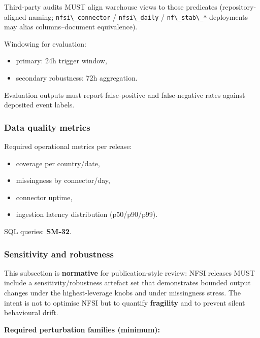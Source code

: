 \documentclass[
  11pt,
  peerreview,journal,onecolumn]{IEEEtran}
\newcommand{\passthrough}[1]{#1}
\providecommand{\tightlist}{%
  \setlength{\itemsep}{0pt}\setlength{\parskip}{0pt}}
\begin{document}
Third-party audits MUST align warehouse views to those predicates
(repository-aligned naming; \passthrough{\lstinline!nfsi\_connector!} /
\passthrough{\lstinline!nfsi\_daily!} /
\passthrough{\lstinline!nf\_stab\_*!} deployments may alias
columns--document equivalence).

Windowing for evaluation:

\begin{itemize}
\tightlist
\item
  primary: 24h trigger window,
\item
  secondary robustness: 72h aggregation.
\end{itemize}

Evaluation outputs must report false-positive and false-negative rates
against deposited event labels.

\hypertarget{data-quality-metrics}{%
\subsubsection{Data quality metrics}\label{data-quality-metrics}}

Required operational metrics per release:

\begin{itemize}
\tightlist
\item
  coverage per country/date,
\item
  missingness by connector/day,
\item
  connector uptime,
\item
  ingestion latency distribution (p50/p90/p99).
\end{itemize}

SQL queries: \textbf{SM-32}.

\hypertarget{sensitivity-and-robustness}{%
\subsubsection{Sensitivity and
robustness}\label{sensitivity-and-robustness}}

This subsection is \textbf{normative} for publication-style review: NFSI
releases MUST include a sensitivity/robustness artefact set that
demonstrates bounded output changes under the highest-leverage knobs and
under missingness stress. The intent is not to optimise NFSI but to
quantify \textbf{fragility} and to prevent silent behavioural drift.

\textbf{Required perturbation families (minimum):}
\end{document}
